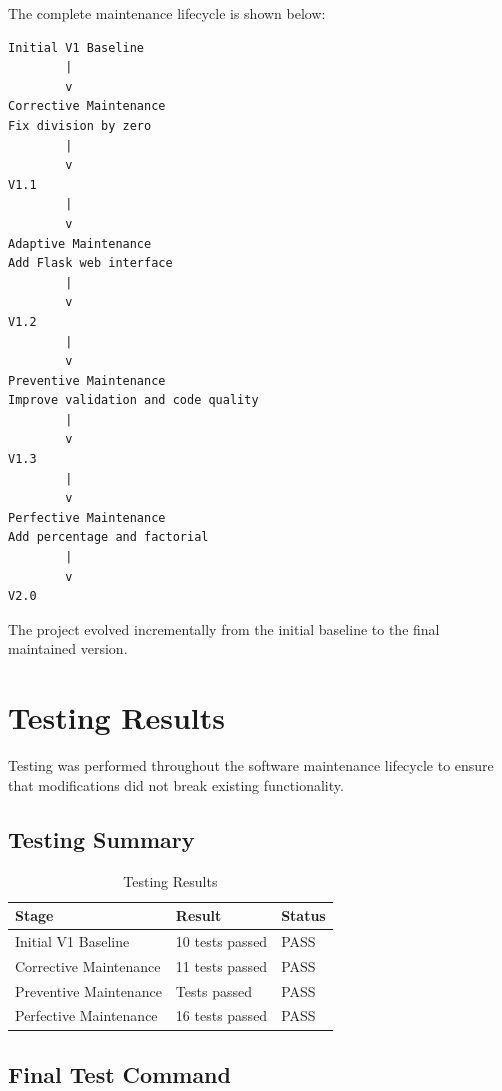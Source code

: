 \documentclass[12pt,a4paper,openany]{report}
\begin{document}
The complete maintenance lifecycle is shown below:

\begin{verbatim}
Initial V1 Baseline
        |
        v
Corrective Maintenance
Fix division by zero
        |
        v
V1.1
        |
        v
Adaptive Maintenance
Add Flask web interface
        |
        v
V1.2
        |
        v
Preventive Maintenance
Improve validation and code quality
        |
        v
V1.3
        |
        v
Perfective Maintenance
Add percentage and factorial
        |
        v
V2.0
\end{verbatim}

The project evolved incrementally from the initial baseline to the
final maintained version.


\chapter{Testing Results}

Testing was performed throughout the software maintenance lifecycle to
ensure that modifications did not break existing functionality.

\section{Testing Summary}

\begin{table}[H]
\centering
\renewcommand{\arraystretch}{1.4}
\begin{tabular}{p{6cm} p{4cm} p{2cm}}
\toprule
\textbf{Stage} & \textbf{Result} & \textbf{Status} \\
\midrule
Initial V1 Baseline & 10 tests passed & PASS \\
Corrective Maintenance & 11 tests passed & PASS \\
Preventive Maintenance & Tests passed & PASS \\
Perfective Maintenance & 16 tests passed & PASS \\
\bottomrule
\end{tabular}
\caption{Testing Results}
\end{table}

\section{Final Test Command}
\end{document}
